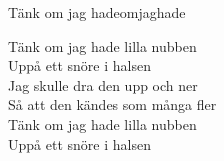 \begin{song}{Tänk om jag hade}{omjaghade}
\begin{vers}
\repopen Tänk om jag hade lilla nubben\\
Uppå ett snöre i halsen \repclose\\
Jag skulle dra den upp och ner\\
Så att den kändes som många fler\\
Tänk om jag hade lilla nubben\\
Uppå ett snöre i halsen\\
\end{vers}
\end{song}
